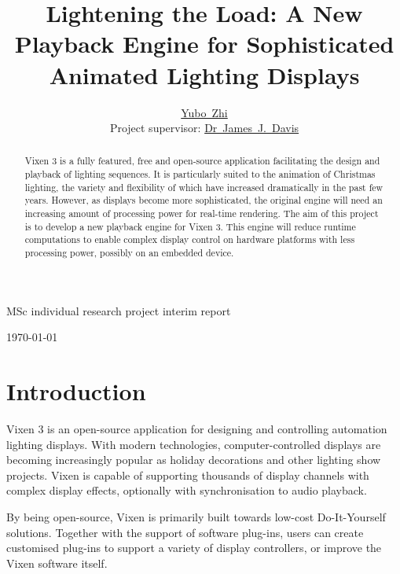 \documentclass[journal]{IEEEtran}
\begin{document}
\title{Lightening the Load: A New Playback Engine for Sophisticated Animated Lighting Displays}

\author{\href{yz4116@imperial.ac.uk}{Yubo~Zhi}\\
	Project supervisor: \href{james.davis06@imperial.ac.uk}{Dr~James~J.~Davis}}

%
{MSc individual research project interim report}

\maketitle

\begin{abstract}
Vixen 3 is a fully featured, free and open-source application facilitating the design and playback of lighting sequences. It is particularly suited to the animation of Christmas lighting, the variety and flexibility of which have increased dramatically in the past few years. However, as displays become more sophisticated, the original engine will need an increasing amount of processing power for real-time rendering. The aim of this project is to develop a new playback engine for Vixen 3. This engine will reduce runtime computations to enable complex display control on hardware platforms with less processing power, possibly on an embedded device.
\end{abstract}

\hfill \today

\tableofcontents

\section{Introduction}

Vixen 3 \cite{vixen} is an open-source application for designing and controlling automation lighting displays. With modern technologies, computer-controlled displays are becoming increasingly popular as holiday decorations and other lighting show projects. Vixen is capable of supporting thousands of display channels with complex display effects, optionally with synchronisation to audio playback.

By being open-source, Vixen is primarily built towards low-cost Do-It-Yourself solutions. Together with the support of software plug-ins, users can create customised plug-ins to support a variety of display controllers, or improve the Vixen software itself.
\end{document}
